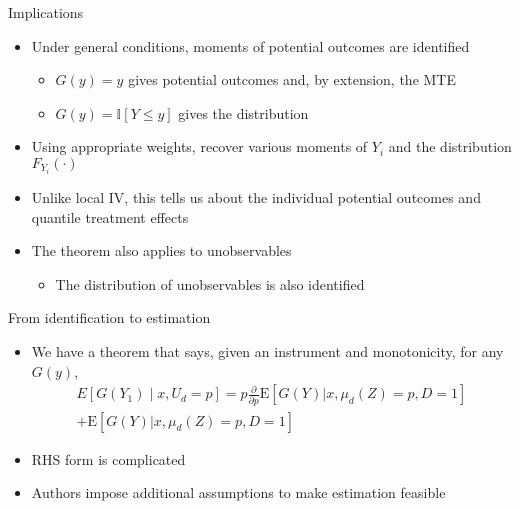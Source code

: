\documentclass{beamer}
\newcommand{\E}{\mathrm{E}} %
\begin{document}
\begin{frame}{Implications}

\begin{itemize}

\item Under general conditions, moments of potential outcomes are
  identified
\begin{itemize}
\item $G(y) = y$ gives potential outcomes and, by extension, the MTE

\item $G(y) = \mathbb{I} \left[ Y \leq y \right]$ gives the
  distribution
\end{itemize}

\pause

\item Using appropriate weights, recover various moments of $Y_i$ and
  the distribution $F_{Y_i}(\cdot)$

\item Unlike local IV, this tells us about the individual potential
  outcomes and quantile treatment effects

\pause

\item The theorem also applies to unobservables
\begin{itemize}
\item The distribution of unobservables is also identified
\end{itemize}

\end{itemize}

\end{frame}


\begin{frame}{From identification to estimation}
  \begin{itemize}
  \item We have a theorem that says, given an instrument and monotonicity, for any $G(y)$,
    \begin{align*}
      E[G(Y_1)\mid x, U_d=p] =   p \frac{\partial}{\partial p} \E\left[ G(Y) |  x, \mu_d(Z) = p, D = 1 \right] \\+  \E \left[ G(Y) | x, \mu_d(Z) = p, D = 1 \right] 
    \end{align*} \pause
  \item RHS form is complicated
    \item Authors impose additional assumptions to make estimation feasible
  \end{itemize}


\end{frame}
\end{document}
